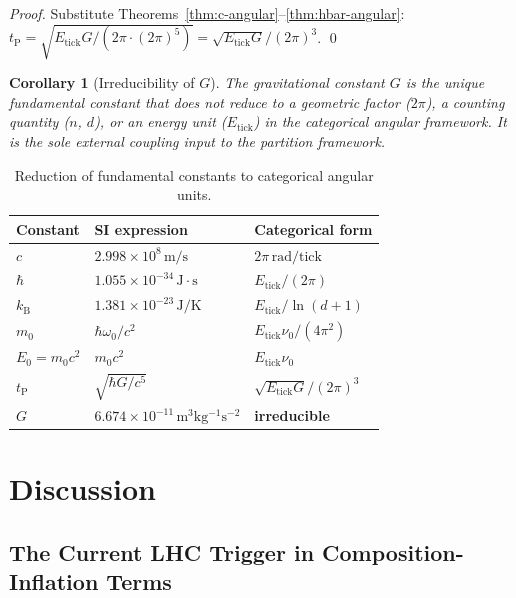 \documentclass[twocolumn,10pt,a4paper]{article}
\theoremstyle{thmstyle}
\newtheorem{corollary}[theorem]{Corollary}
\theoremstyle{definition}
\theoremstyle{remark}
\newcommand{\tP}{t_{\mathrm{P}}}
\newcommand{\kB}{k_{\mathrm{B}}}
\begin{document}
\begin{proof}
Substitute Theorems~\ref{thm:c-angular}--\ref{thm:hbar-angular}:
$\tP = \sqrt{E_{\mathrm{tick}} G / (2\pi \cdot (2\pi)^5)} =
\sqrt{E_{\mathrm{tick}} G}/(2\pi)^3$. \qed
\end{proof}

\begin{corollary}[Irreducibility of $G$]
The gravitational constant $G$ is the unique fundamental constant that
does not reduce to a geometric factor ($2\pi$), a counting quantity
($n$, $d$), or an energy unit ($E_{\mathrm{tick}}$) in the categorical
angular framework. It is the sole external coupling input to the
partition framework.
\end{corollary}

\begin{table}[h]
\centering
\caption{Reduction of fundamental constants to categorical angular units.}
\label{tab:constants}
\begin{tabular}{lll}
\toprule
Constant & SI expression & Categorical form \\
\midrule
$c$ & $2.998 \times 10^8\,\mathrm{m/s}$ & $2\pi\,\mathrm{rad/tick}$ \\
$\hbar$ & $1.055 \times 10^{-34}\,\mathrm{J\cdot s}$ & $E_{\mathrm{tick}}/(2\pi)$ \\
$\kB$ & $1.381 \times 10^{-23}\,\mathrm{J/K}$ & $E_{\mathrm{tick}}/\ln(d{+}1)$ \\
$m_0$ & $\hbar\omega_0/c^2$ & $E_{\mathrm{tick}}\nu_0/(4\pi^2)$ \\
$E_0 = m_0 c^2$ & $m_0 c^2$ & $E_{\mathrm{tick}}\nu_0$ \\
$\tP$ & $\sqrt{\hbar G/c^5}$ & $\sqrt{E_{\mathrm{tick}}G}/(2\pi)^3$ \\
$G$ & $6.674\times 10^{-11}\,\mathrm{m^3 kg^{-1} s^{-2}}$ & \textbf{irreducible} \\
\bottomrule
\end{tabular}
\end{table}

\section{Discussion}
\label{sec:discussion}

\subsection{The Current LHC Trigger in Composition-Inflation Terms}
\end{document}
